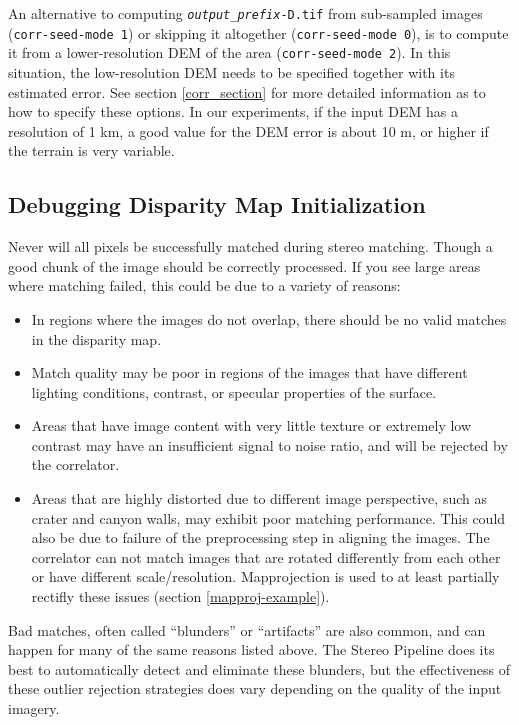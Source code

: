 An alternative to computing \texttt{\textit{output\_prefix}-D.tif}
from sub-sampled images (\texttt{corr-seed-mode 1}) or skipping it
altogether (\texttt{corr-seed-mode 0}), is to compute it from a
lower-resolution DEM of the area (\texttt{corr-seed-mode 2}). In this
situation, the low-resolution DEM needs to be specified together with its estimated
error. See section \ref{corr_section} for more detailed information as
to how to specify these options. In our experiments, if the input DEM
has a resolution of 1 km, a good value for the DEM error is about 10 m,
or higher if the terrain is very variable.

\subsection{Debugging Disparity Map Initialization}

Never will all pixels be successfully matched during stereo
matching. Though a good chunk of the image should be correctly
processed. If you see large areas where matching failed, this could be
due to a variety of reasons:

\begin{itemize}
\item In regions where the images do not overlap, there should be no
  valid matches in the disparity map.
\item Match quality may be poor in regions of the images that have
  different lighting conditions, contrast, or specular properties of
  the surface.
\item Areas that have image content with very little texture or
  extremely low contrast may have an insufficient signal to noise
  ratio, and will be rejected by the correlator.
\item Areas that are highly distorted due to different image
  perspective, such as crater and canyon walls, may exhibit poor
  matching performance. This could also be due to failure of the
  preprocessing step in aligning the images. The correlator can not
  match images that are rotated differently from each other or have
  different scale/resolution. Mapprojection is used to at least
  partially rectifly these issues (section \ref{mapproj-example}).
\end{itemize}

Bad matches, often called ``blunders'' or ``artifacts'' are also
common, and can happen for many of the same reasons listed above.  The
Stereo Pipeline does its best to automatically detect and eliminate
these blunders, but the effectiveness of these outlier rejection
strategies does vary depending on the quality of the input imagery.

